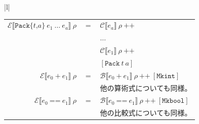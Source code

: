 \documentclass{jbook}
\begin{document}
\begin{tabular} {|l|}
\begin{tabular}{r c l}
		$\mathcal{E} \llbracket \texttt{Pack\{} t \texttt{,} a \texttt{\}} ~ e_1 ~ \ldots ~ e_a \rrbracket ~ \rho$ & $=$ & $\mathcal{C} \llbracket e_a \rrbracket ~ \rho ~ \texttt{++}$                                                                                                                                 \\
		                                                                                                           &     & $\ldots$                                                                                                                                                                                     \\
		                                                                                                           &     & $\mathcal{C} \llbracket e_1 \rrbracket ~ \rho ~ \texttt{++}$                                                                                                                                 \\
		                                                                                                           &     & $\left[\texttt{Pack} ~ t ~ a \right]$                                                                                                                                                        \\
		$\mathcal{E} \llbracket e_0 ~ \texttt{+} ~ e_1 \rrbracket ~ \rho$                                          & $=$ & $\mathcal{B} \llbracket e_0 ~ \texttt{+} ~ e_1 \rrbracket ~ \rho ~ \texttt{++} ~ \left[\texttt{Mkint} \right]$                                                                               \\
		                                                                                                           &     & 他の算術式についても同様。                                                                                                                                                                   \\
		$\mathcal{E} \llbracket e_0 ~ \texttt{==} ~ e_1 \rrbracket ~ \rho$                                         & $=$ & $\mathcal{B} \llbracket e_0 ~ \texttt{==} ~ e_1 \rrbracket ~ \rho ~ \texttt{++} ~ \left[\texttt{Mkbool} \right]$                                                                             \\
		                                                                                                           &     & 他の比較式についても同様。                                                                                                                                                                   \\

\end{tabular}
\end{tabular}
\end{document}
